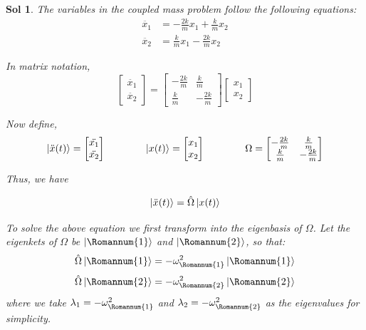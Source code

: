 \documentclass[12pt,a4paper]{report}
\newcommand{\rom}[1]{\Romannum{#1}}
\newtheorem*{solution}{Sol}
\begin{document}
\begin{solution}
    The variables in the coupled mass problem follow the following equations:
    \begin{align*}
        \ddot{x_1} &= -\frac{2k}{m}x_1 + \frac{k}{m}x_2 \\
        \ddot{x_2} &= \frac{k}{m}x_1 - \frac{2k}{m}x_2
    \end{align*}

    In matrix notation,
    \begin{equation*}
        \begin{bmatrix}
            \ddot{x_1} \\
            \ddot{x_2}
        \end{bmatrix}
        =
        \begin{bmatrix}
            -\frac{2k}{m} & \frac{k}{m} \\
            \frac{k}{m} & -\frac{2k}{m}
        \end{bmatrix}
        \begin{bmatrix}
            x_1 \\
            x_2
        \end{bmatrix}
    \end{equation*}

    Now define,
    \begin{equation*}
        \ket{\ddot{x}(t)} = \begin{bmatrix}
            \ddot{x_1} \\
            \ddot{x_2}
        \end{bmatrix}
        \qquad
        \qquad
        \ket{x(t)} = \begin{bmatrix}
            x_1 \\
            x_2
        \end{bmatrix}
        \qquad
        \qquad
        \Omega = \begin{bmatrix}
            -\frac{2k}{m} & \frac{k}{m} \\
            \frac{k}{m} & -\frac{2k}{m}
        \end{bmatrix}
    \end{equation*}

    Thus, we have

    \begin{equation*}
        \ket{\ddot{x}(t)} = \hat{\Omega}\ket{x(t)}
    \end{equation*}

    To solve the above equation we first transform into the eigenbasis of $\Omega$. Let the eigenkets of $\Omega$ be $\ket{\rom{1}}$ and $\ket{\rom{2}}$, so that:
    \begin{equation*}
        \hat{\Omega}\ket{\rom{1}} = -\omega_{\rom{1}}^2 \ket{\rom{1}}
    \end{equation*}
    \begin{equation*}
        \hat{\Omega}\ket{\rom{2}} = -\omega_{\rom{2}}^2 \ket{\rom{2}}
    \end{equation*}
    where we take $\lambda_1 = -\omega_{\rom{1}}^2$ and $\lambda_2 = -\omega_{\rom{2}}^2$ as the eigenvalues for simplicity.


\end{solution}
\end{document}
